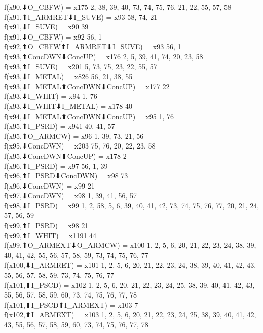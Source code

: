 f(x90,⬇O_CBFW) = x175 {2, 38, 39, 40, 73, 74, 75, 76, 21, 22, 55, 57, 58} \\
f(x91,⬆I_ARMRET⬇I_SUVE) = x93 {58, 74, 21} \\
f(x91,⬇I_SUVE) = x90 {39} \\
f(x91,⬇O_CBFW) = x92 {56, 1} \\
f(x92,⬆O_CBFW⬆I_ARMRET⬇I_SUVE) = x93 {56, 1} \\
f(x93,⬆ConcDWN⬇ConcUP) = x176 {2, 5, 39, 41, 74, 20, 23, 58} \\
f(x93,⬆I_SUVE) = x201 {5, 73, 75, 23, 22, 55, 57} \\
f(x93,⬇I_METAL) = x826 {56, 21, 38, 55} \\
f(x93,⬇I_METAL⬆ConcDWN⬇ConcUP) = x177 {22} \\
f(x93,⬇I_WHIT) = x94 {1, 76} \\
f(x93,⬇I_WHIT⬇I_METAL) = x178 {40} \\
f(x94,⬇I_METAL⬆ConcDWN⬇ConcUP) = x95 {1, 76} \\
f(x95,⬆I_PSRD) = x941 {40, 41, 57} \\
f(x95,⬆O_ARMCW) = x96 {1, 39, 73, 21, 56} \\
f(x95,⬇ConcDWN) = x203 {75, 76, 20, 22, 23, 58} \\
f(x95,⬇ConcDWN⬆ConcUP) = x178 {2} \\
f(x96,⬆I_PSRD) = x97 {56, 1, 39} \\
f(x96,⬆I_PSRD⬇ConcDWN) = x98 {73} \\
f(x96,⬇ConcDWN) = x99 {21} \\
f(x97,⬇ConcDWN) = x98 {1, 39, 41, 56, 57} \\
f(x98,⬇I_PSRD) = x99 {1, 2, 58, 5, 6, 39, 40, 41, 42, 73, 74, 75, 76, 77, 20, 21, 24, 57, 56, 59} \\
f(x99,⬆I_PSRD) = x98 {21} \\
f(x99,⬆I_WHIT) = x1191 {44} \\
f(x99,⬆O_ARMEXT⬇O_ARMCW) = x100 {1, 2, 5, 6, 20, 21, 22, 23, 24, 38, 39, 40, 41, 42, 55, 56, 57, 58, 59, 73, 74, 75, 76, 77} \\
f(x100,⬇I_ARMRET) = x101 {1, 2, 5, 6, 20, 21, 22, 23, 24, 38, 39, 40, 41, 42, 43, 55, 56, 57, 58, 59, 73, 74, 75, 76, 77} \\
f(x101,⬆I_PSCD) = x102 {1, 2, 5, 6, 20, 21, 22, 23, 24, 25, 38, 39, 40, 41, 42, 43, 55, 56, 57, 58, 59, 60, 73, 74, 75, 76, 77, 78} \\
f(x101,⬆I_PSCD⬆I_ARMEXT) = x103 {7} \\
f(x102,⬆I_ARMEXT) = x103 {1, 2, 5, 6, 20, 21, 22, 23, 24, 25, 38, 39, 40, 41, 42, 43, 55, 56, 57, 58, 59, 60, 73, 74, 75, 76, 77, 78} \\
